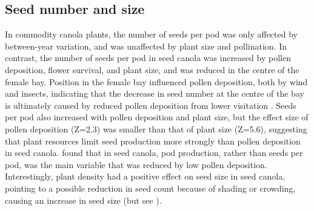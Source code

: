 \documentclass[12pt, draft]{article} %
\begin{document}
\subsection{Seed number and size}
In commodity canola plants, the number of seeds per pod was only affected by between-year variation, and was unaffected by plant size and pollination.
In contrast, the number of seeds per pod in seed canola was increased by pollen deposition, flower survival, and plant size, and was reduced in the centre of the female bay. 
Position in the female bay influenced pollen deposition, both by wind and insects, indicating that the decrease in seed number at the centre of the bay is ultimately caused by reduced pollen deposition from lower visitation \citep{mesquida1981,mesquida1982}.
Seeds per pod also increased with pollen deposition and plant size, but the effect size of pollen deposition (Z=2.3) was smaller than that of plant size (Z=5.6), suggesting that plant resources limit seed production more strongly than pollen deposition in seed canola.
\citet{mesquida1982} found that in seed canola, pod production, rather than seeds per pod, was the main variable that was reduced by low pollen deposition.
Interestingly, plant density had a positive effect on seed size in seed canola, pointing to a possible reduction in seed count because of shading or crowding, causing an increase in seed size (but see \citealp{angadi2003}).
\end{document}
